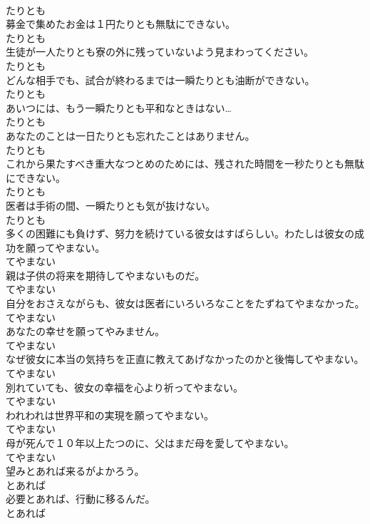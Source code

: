 \documentclass[8pt]{extreport}
\begin{document}
\begin{CJK}{UTF8}{min}
\\	たりとも
\\	募金で集めたお金は１円たりとも無駄にできない。	
\\	たりとも
\\	生徒が一人たりとも寮の外に残っていないよう見まわってください。	
\\	たりとも
\\	どんな相手でも、試合が終わるまでは一瞬たりとも油断ができない。	
\\	たりとも
\\	あいつには、もう一瞬たりとも平和なときはない…	
\\	たりとも
\\	あなたのことは一日たりとも忘れたことはありません。	
\\	たりとも
\\	これから果たすべき重大なつとめのためには、残された時間を一秒たりとも無駄にできない。	
\\	たりとも
\\	医者は手術の間、一瞬たりとも気が抜けない。	
\\	たりとも
\\	多くの困難にも負けず、努力を続けている彼女はすばらしい。わたしは彼女の成功を願ってやまない。	
\\	てやまない
\\	親は子供の将来を期待してやまないものだ。	
\\	てやまない
\\	自分をおさえながらも、彼女は医者にいろいろなことをたずねてやまなかった。	
\\	てやまない
\\	あなたの幸せを願ってやみません。	
\\	てやまない
\\	なぜ彼女に本当の気持ちを正直に教えてあげなかったのかと後悔してやまない。	
\\	てやまない
\\	別れていても、彼女の幸福を心より祈ってやまない。	
\\	てやまない
\\	われわれは世界平和の実現を願ってやまない。	
\\	てやまない
\\	母が死んで１０年以上たつのに、父はまだ母を愛してやまない。	
\\	てやまない
\\	望みとあれば来るがよかろう。	
\\	とあれば
\\	必要とあれば、行動に移るんだ。	
\\	とあれば

\end{CJK}
\end{document}
